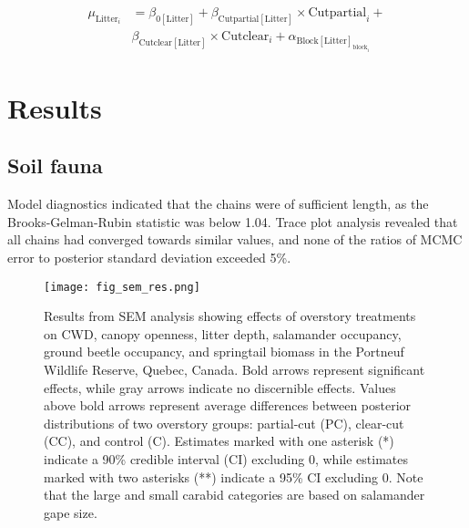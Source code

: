 \begin{align}
  \mu_{\text{Litter}_i} &= \beta_{0[\text{Litter}]} + \beta_{\text{Cutpartial}[\text{Litter}]} \times \text{Cutpartial}_{i} + \nonumber\\
  & \beta_{\text{Cutclear}[\text{Litter}]} \times \text{Cutclear}_{i} + \alpha_{\text{Block}[\text{Litter}]_{\text{block}_i}} \nonumber
\end{align}


\clearpage

\section*{Results}
\label{sec:results1}


\subsection*{Soil fauna}
\label{subsec:taxa}

Model diagnostics indicated that the chains were of sufficient length, as the Brooks-Gelman-Rubin statistic was below 1.04. 
Trace plot analysis revealed that all chains had converged towards similar values, and none of the ratios of MCMC error to posterior standard deviation exceeded 5\%.

\vspace{10pt}

\begin{figure}[ht]
	\centering
	\texttt{[image: fig\_sem\_res.png]}
	\caption[Results from structural equation modeling analysis revealing effects of overstory treatments on coarse woody debris volume,
  canopy openness, litter depth, salamander occupancy, ground beetle occupancy, and springtail biomass.]
  {Results from SEM analysis showing effects of overstory treatments on CWD, 
  canopy openness, litter depth, salamander occupancy, ground beetle occupancy, and springtail biomass in the Portneuf Wildlife Reserve, 
  Quebec, Canada. Bold arrows represent significant effects, while gray arrows indicate no discernible effects. 
  Values above bold arrows represent average differences between posterior distributions of two overstory groups: 
  partial-cut (PC), clear-cut (CC), and control (C). Estimates marked with one asterisk (*) 
  indicate a 90\% credible interval (CI) excluding 0, while estimates marked with two asterisks (**) indicate a 95\% CI excluding 0. 
  Note that the large and small carabid categories are based on salamander gape size.}
	\label{fig:SEMres}
\end{figure}  

